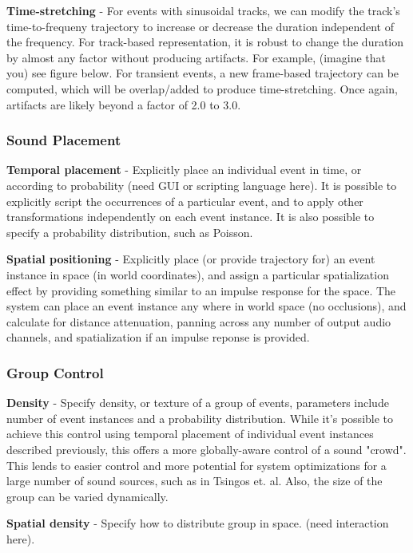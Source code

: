 \documentclass{acmsiggraph}               %
\begin{document}
\textbf{Time-stretching} - For events with sinusoidal tracks, we can modify the 
track's time-to-frequeny trajectory to increase or decrease the duration 
independent of the frequency.  For track-based representation, it is 
robust to change the duration by almost any factor without producing 
artifacts.  For example, (imagine that you) see figure below.  For 
transient events, a new frame-based trajectory can be computed, which 
will be overlap/added to produce time-stretching.  Once again, artifacts
are likely beyond a factor of 2.0 to 3.0.


\subsubsection{Sound Placement}

\textbf{Temporal placement} -  Explicitly place an individual event in time, or 
according to probability (need GUI or scripting language here).  It is possible
to explicitly script the occurrences of a particular event, and to apply other
transformations independently on each event instance.  It is also possible to
specify a probability distribution, such as Poisson.

\textbf{Spatial positioning} - Explicitly place (or provide trajectory for) an 
event instance in space (in world coordinates), and assign a particular 
spatialization effect by providing something similar to an impulse response
for the space.  The system can place an event instance any where in world
space (no occlusions), and calculate for distance attenuation, panning across
any number of output audio channels, and spatialization if an impulse reponse
is provided.


\subsubsection{Group Control}

\textbf{Density} - Specify density, or texture of a group of events, parameters include 
number of event instances and a probability distribution.  While it's possible to achieve
this control using temporal placement of individual event instances described previously,
this offers a more globally-aware control of a sound "crowd".  This lends to easier
control and more potential for system optimizations for a large number of sound sources,
such as in Tsingos et. al.  Also, the size of the group can be varied dynamically. 

\textbf{Spatial density} - Specify how to distribute group in space.  (need interaction here).
\end{document}
